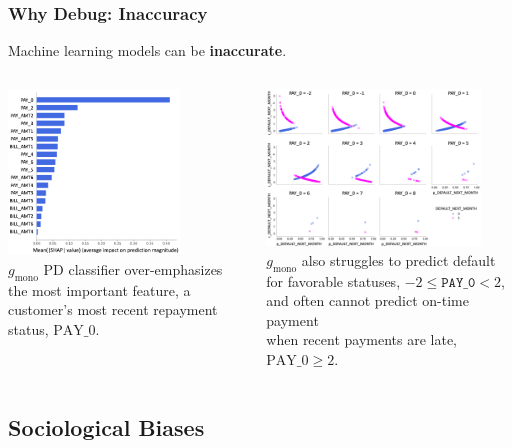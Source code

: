 \documentclass[11pt,
               aspectratio=169,
               hyperref={colorlinks}
               ]{beamer}
\begin{document}
			\begin{frame}
		
				\frametitle{Why Debug: Inaccuracy}
		
					\footnotesize{Machine learning models can be \textbf{inaccurate}.}
					\begin{columns}
				
						\centering
						\includegraphics[height=125pt]{../img/global_shap.png}\\
						\vspace{5pt}
						\tiny{$g_{\text{mono}}$ PD classifier over-emphasizes the most important feature, a customer's most recent repayment status, $\text{PAY\_0}$.}

						\vspace{11pt}
						\centering
						\includegraphics[height=118pt]{../img/resid.png}\\
						\vspace{7pt}
						\tiny{$g_{\text{mono}}$ also struggles to predict default for favorable statuses, $-2  \leq \texttt{PAY\_0}  < 2$, and often cannot predict on-time payment\\when recent payments are late, $\text{PAY\_0} \geq 2$}.
				
					\end{columns}
					\normalsize
			
			\end{frame}
	
		\subsection{Sociological Biases}
	
\end{document}
